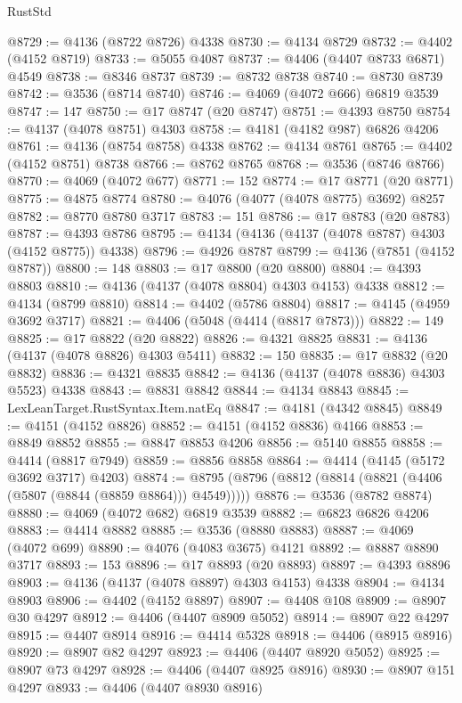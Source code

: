 \begin{lexlean}{RustStd}
\begin{coremodule}
@8729 := @4136 (@8722 @8726) @4338
@8730 := @4134 @8729
@8732 := @4402 (@4152 @8719)
@8733 := @5055 @4087
@8737 := @4406 (@4407 @8733 @6871) @4549
@8738 := @8346 @8737
@8739 := @8732 @8738
@8740 := @8730 @8739
@8742 := @3536 (@8714 @8740)
@8746 := @4069 (@4072 @666) @6819 @3539
@8747 := 147
@8750 := @17 @8747 (@20 @8747)
@8751 := @4393 @8750
@8754 := @4137 (@4078 @8751) @4303
@8758 := @4181 (@4182 @987) @6826 @4206
@8761 := @4136 (@8754 @8758) @4338
@8762 := @4134 @8761
@8765 := @4402 (@4152 @8751) @8738
@8766 := @8762 @8765
@8768 := @3536 (@8746 @8766)
@8770 := @4069 (@4072 @677)
@8771 := 152
@8774 := @17 @8771 (@20 @8771)
@8775 := @4875 @8774
@8780 := @4076 (@4077 (@4078 @8775) @3692) @8257
@8782 := @8770 @8780 @3717
@8783 := 151
@8786 := @17 @8783 (@20 @8783)
@8787 := @4393 @8786
@8795 := @4134 (@4136 (@4137 (@4078 @8787) @4303 (@4152 @8775)) @4338)
@8796 := @4926 @8787
@8799 := @4136 (@7851 (@4152 @8787))
@8800 := 148
@8803 := @17 @8800 (@20 @8800)
@8804 := @4393 @8803
@8810 := @4136 (@4137 (@4078 @8804) @4303 @4153) @4338
@8812 := @4134 (@8799 @8810)
@8814 := @4402 (@5786 @8804)
@8817 := @4145 (@4959 @3692 @3717)
@8821 := @4406 (@5048 (@4414 (@8817 @7873)))
@8822 := 149
@8825 := @17 @8822 (@20 @8822)
@8826 := @4321 @8825
@8831 := @4136 (@4137 (@4078 @8826) @4303 @5411)
@8832 := 150
@8835 := @17 @8832 (@20 @8832)
@8836 := @4321 @8835
@8842 := @4136 (@4137 (@4078 @8836) @4303 @5523) @4338
@8843 := @8831 @8842
@8844 := @4134 @8843
@8845 := LexLeanTarget.RustSyntax.Item.natEq
@8847 := @4181 (@4342 @8845)
@8849 := @4151 (@4152 @8826)
@8852 := @4151 (@4152 @8836) @4166
@8853 := @8849 @8852
@8855 := @8847 @8853 @4206
@8856 := @5140 @8855
@8858 := @4414 (@8817 @7949)
@8859 := @8856 @8858
@8864 := @4414 (@4145 (@5172 @3692 @3717) @4203)
@8874 := @8795 (@8796 (@8812 (@8814 (@8821 (@4406 (@5807 (@8844 (@8859 @8864))) @4549)))))
@8876 := @3536 (@8782 @8874)
@8880 := @4069 (@4072 @682) @6819 @3539
@8882 := @6823 @6826 @4206
@8883 := @4414 @8882
@8885 := @3536 (@8880 @8883)
@8887 := @4069 (@4072 @699)
@8890 := @4076 (@4083 @3675) @4121
@8892 := @8887 @8890 @3717
@8893 := 153
@8896 := @17 @8893 (@20 @8893)
@8897 := @4393 @8896
@8903 := @4136 (@4137 (@4078 @8897) @4303 @4153) @4338
@8904 := @4134 @8903
@8906 := @4402 (@4152 @8897)
@8907 := @4408 @108
@8909 := @8907 @30 @4297
@8912 := @4406 (@4407 @8909 @5052)
@8914 := @8907 @22 @4297
@8915 := @4407 @8914
@8916 := @4414 @5328
@8918 := @4406 (@8915 @8916)
@8920 := @8907 @82 @4297
@8923 := @4406 (@4407 @8920 @5052)
@8925 := @8907 @73 @4297
@8928 := @4406 (@4407 @8925 @8916)
@8930 := @8907 @151 @4297
@8933 := @4406 (@4407 @8930 @8916)

\end{coremodule}
\end{lexlean}
